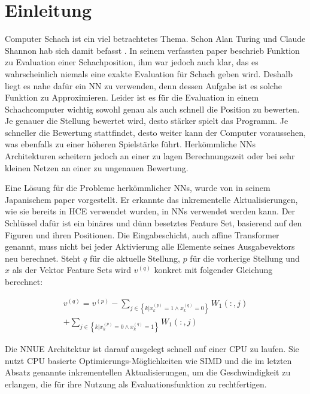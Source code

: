\chapter{Einleitung}

Computer Schach ist ein viel betrachtetes Thema. Schon Alan Turing und Claude Shannon hab sich damit befasst \cite{Turing1953, Shannon1950}. In seinem \citeyear{Shannon1950} verfassten paper beschrieb \citeauthor{Shannon1950} \cite{Shannon1950} Funktion zu Evaluation einer Schachposition, ihm war jedoch auch klar, das es wahrscheinlich niemals eine exakte Evaluation für Schach geben wird. Deshalb liegt es nahe dafür ein \ac{NN} zu verwenden, denn dessen Aufgabe ist es solche Funktion zu Approximieren. Leider ist es für die Evaluation in einem Schachcomputer wichtig sowohl genau als auch schnell die Position zu bewerten. Je genauer die Stellung bewertet wird, desto stärker spielt das Programm. Je schneller die Bewertung stattfindet, desto weiter kann der Computer voraussehen, was ebenfalls zu einer höheren Spielstärke führt. Herkömmliche \acp{NN} Architekturen scheitern jedoch an einer zu lagen Berechnungszeit oder bei sehr kleinen Netzen an einer zu ungenauen Bewertung.

Eine Lösung für die Probleme herkömmlicher \acp{NN}, wurde \citeyear{YNasu2018} von \citeauthor{YNasu2018} \cite{YNasu2018} in seinem Japanischem paper vorgestellt. Er erkannte das inkrementelle Aktualisierungen, wie sie bereits in \ac{HCE} verwendet wurden, in \acp{NN} verwendet werden kann. Der Schlüssel dafür ist ein binäres und dünn besetztes Feature Set, basierend auf den Figuren und ihren Positionen. Die Eingabeschicht, auch affine Transformer genannt, muss nicht bei jeder Aktivierung alle Elemente seines Ausgabevektors neu berechnet. Steht $q$ für die aktuelle Stellung, $p$ für die vorherige Stellung und $x$ als der Vektor Feature Sets wird $v^{(q)}$ konkret mit folgender Gleichung berechnet:

\begin{equation}
  \begin{split}
    v^{(q)} = v^{(p)} 
              - \sum_{j \in \left \{ k | x_{k}^{(p)}=1\wedge x_{k}^{(q)}=0 \right \}}^{} W_{1}(:,j) \\
              + \sum_{j \in \left \{ k | x_{k}^{(p)}=0\wedge x_{k}^{(q)}=1 \right \}}^{} W_{1}(:,j)
  \end{split}
\end{equation}

Die \ac{NNUE} Architektur ist darauf ausgelegt schnell auf einer CPU zu laufen. Sie nutzt CPU basierte Optimierungs-Möglichkeiten wie \ac{SIMD} und die im letzten Absatz genannte inkrementellen Aktualisierungen, um die Geschwindigkeit zu erlangen, die für ihre Nutzung als Evaluationsfunktion zu rechtfertigen.

